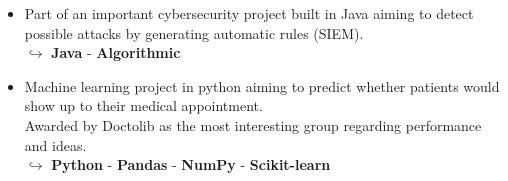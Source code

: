 \documentclass[9pt,a4paper,ragged2e]{altacv}
\begin{document}




\divider
{}
\begin{itemize}
	\item Part of an important cybersecurity project built in Java aiming to detect possible attacks by generating automatic rules (SIEM).\\
  $\hookrightarrow$ \textbf{Java} - \textbf{Algorithmic}
\end{itemize}
\begin{itemize}
	\item Machine learning project in python aiming to predict whether patients would show up to their medical appointment. \\Awarded by Doctolib as the most interesting group regarding performance and ideas.\\
  $\hookrightarrow$ \textbf{Python} - \textbf{Pandas} - \textbf{NumPy} - \textbf{Scikit-learn}
\end{itemize}
\end{document}
